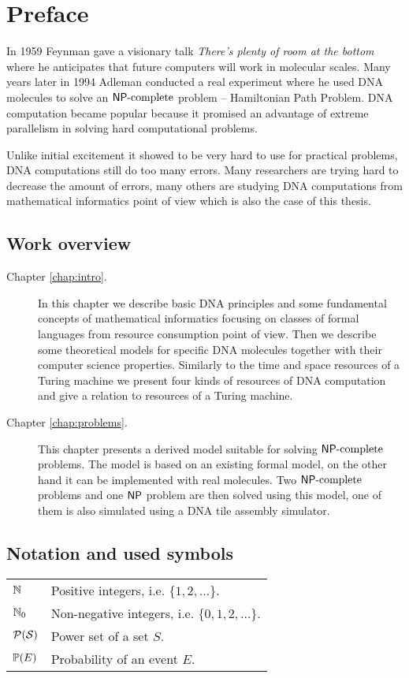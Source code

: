 \cleardoublepage{}   %
\chapter*{Preface}

In 1959 Feynman gave a visionary talk {\em There's plenty of room at the bottom} \cite{feynman} where he anticipates that future computers will work in molecular scales. Many years later in 1994 Adleman conducted a real experiment \cite{adleman94} where he used DNA molecules to solve an $\mathsf{NP}\textnormal{-complete}$ problem -- Hamiltonian Path Problem. DNA computation became popular because it promised an advantage of extreme parallelism in solving hard computational problems.

Unlike initial excitement it showed to be very hard to use for practical problems, DNA computations still do too many errors. Many researchers are trying hard to decrease the amount of errors, many others are studying DNA computations from mathematical informatics point of view which is also the case of this thesis.

\section*{Work overview}
	
	\begin{description}
		\item[Chapter \ref{chap:intro}.] In this chapter we describe basic DNA principles and some fundamental concepts of mathematical informatics focusing on classes of formal languages from resource consumption point of view. Then we describe some theoretical models for specific DNA molecules together with their computer science properties. Similarly to the time and space resources of a Turing machine we present four kinds of resources of DNA computation and give a relation to resources of a Turing machine.
		\item[Chapter \ref{chap:problems}.] This chapter presents a derived model suitable for solving $\mathsf{NP}\textnormal{-complete}$ problems. The model is based on an existing formal model, on the other hand it can be implemented with real molecules. Two $\mathsf{NP}\textnormal{-complete}$ problems and one $\mathsf{NP}$ problem are then solved using this model, one of them is also simulated using a DNA tile assembly simulator.
	\end{description}

\section*{Notation and used symbols}
	
	\begin{tabularx}{\textwidth}{p{3em} X}
		$\mathbb{N}$ & Positive integers, i.e. $\{1, 2, \ldots\}$.\\
		$\mathbb{N}_0$ & Non-negative integers, i.e. $\{0, 1, 2, \ldots\}$.\\
		$\cal P(S)$ & Power set of a set $S$.\\
		$\mathbb{P}(E)$ & Probability of an event $E$.
	\end{tabularx}
	